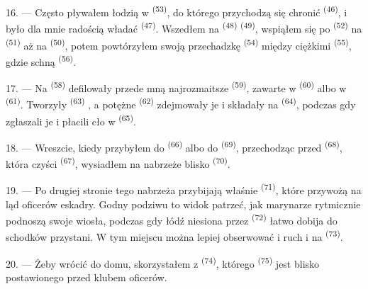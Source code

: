 \VUsaut{3.0mm}
\VUsaut{3.0mm}

16. --- Często pływałem łodzią w  \textsuperscript{(53)}, do
którego przychodzą się chronić  \textsuperscript{(46)}, i było dla mnie
radością władać  \textsuperscript{(47)}. Wszedłem na 
\textsuperscript{(48)}  \textsuperscript{(49)}, wspiąłem się po
 \textsuperscript{(52)} na  \textsuperscript{(51)} aż na
 \textsuperscript{(50)}, potem powtórzyłem swoją przechadzkę 
\textsuperscript{(54)} między ciężkimi 
\textsuperscript{(55)}, gdzie schną  \textsuperscript{(56)}.

17. --- Na  \textsuperscript{(58)} defilowały przede mną najrozmaitsze
 \textsuperscript{(59)}, zawarte w 
\textsuperscript{(60)} albo w  \textsuperscript{(61)}. Tworzyły
 \textsuperscript{(63)} , a potężne 
\textsuperscript{(62)} zdejmowały je i składały na 
\textsuperscript{(64)}, podczas gdy  zgłaszali je i płacili cło w
 \textsuperscript{(65)}.

18. --- Wreszcie, kiedy przybyłem do  \textsuperscript{(66)}
albo do  \textsuperscript{(69)}, przechodząc przed 
\textsuperscript{(68)}, która czyści  \textsuperscript{(67)},
wysiadłem na nabrzeże blisko  \textsuperscript{(70)}.

19. --- Po drugiej stronie tego nabrzeża przybijają właśnie 
\textsuperscript{(71)}, które przywożą na ląd oficerów eskadry. Godny podziwu to widok
patrzeć, jak marynarze rytmicznie podnoszą swoje wiosła, podczas gdy łódź niesiona przez
 \textsuperscript{(72)} łatwo dobija do schodków przystani. W tym miejscu
można lepiej obserwować  i ruch  i  na
 \textsuperscript{(73)}.

\VUsaut{3.0mm}
\VUsaut{3.0mm}

20. --- Żeby wrócić do domu, skorzystałem z 
\textsuperscript{(74)}, którego  \textsuperscript{(75)} jest blisko
 postawionego przed klubem oficerów.

